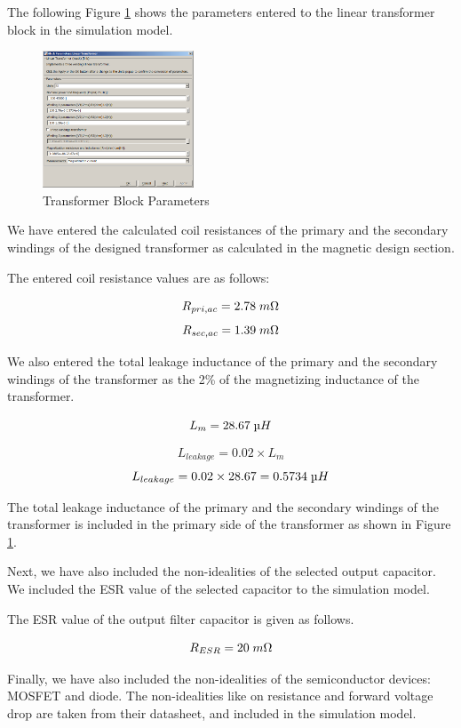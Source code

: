 The following Figure \ref{fig:trans_para} shows the parameters entered to the linear transformer block in the simulation model.

\begin{figure}[H]
\begin{center}
\includegraphics[width=0.4\textwidth]{simulations/transformer_para.png}
\caption{Transformer Block Parameters}
\label{fig:trans_para}
\end{center}
\end{figure}

We have entered the calculated coil resistances of the primary and the secondary windings of the designed transformer as calculated in the magnetic design section.

The entered coil resistance values are as follows:

$$ R_{pri,ac} = 2.78\;m\ohm $$
$$ R_{sec,ac} = 1.39\;m\ohm $$

We also entered the total leakage inductance of the primary and the secondary windings of the transformer as the 2\% of the magnetizing inductance of the transformer.

$$ L_m = 28.67\;\micro H $$

$$ L_{leakage} = 0.02\times L_m $$
$$ L_{leakage} = 0.02\times 28.67 = 0.5734\;\micro H $$

The total leakage inductance of the primary and the secondary windings of the transformer is included in the primary side of the transformer as shown in Figure \ref{fig:trans_para}.

Next, we have also included the non-idealities of the selected output capacitor. We included the ESR value of the selected capacitor to the simulation model.

The ESR value of the output filter capacitor is given as follows.

$$ R_{ESR} = 20\;m\ohm $$

Finally, we have also included the non-idealities of the semiconductor devices: MOSFET and diode. The non-idealities like on resistance and forward voltage drop are taken from their datasheet, and included in the simulation model.

